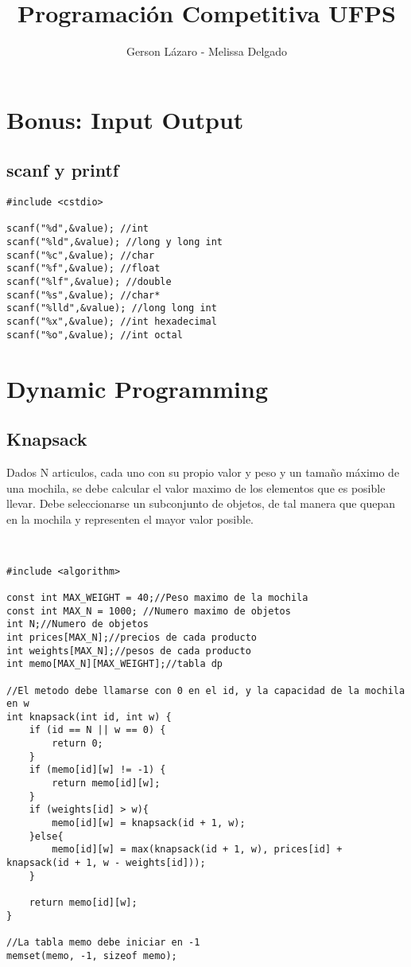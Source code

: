 \documentclass[11pt,letterpaper,twocolumn,twosided]{article}
\begin{document}
\title{Programaci\'on Competitiva UFPS}
\author{Gerson L\'azaro - Melissa Delgado}
\maketitle
\tableofcontents
{}


\section{Bonus: Input Output}

\subsection{scanf y printf}
\begin{lstlisting}
#include <cstdio>

scanf("%d",&value); //int
scanf("%ld",&value); //long y long int
scanf("%c",&value); //char 
scanf("%f",&value); //float
scanf("%lf",&value); //double
scanf("%s",&value); //char*
scanf("%lld",&value); //long long int
scanf("%x",&value); //int hexadecimal
scanf("%o",&value); //int octal
\end{lstlisting}

\section{Dynamic Programming}

\subsection{Knapsack}
Dados N articulos, cada uno con su propio valor y peso y un tama\~no m\'aximo de una mochila, se debe calcular el valor maximo de los elementos que es posible llevar.
Debe seleccionarse un subconjunto de objetos, de tal manera que quepan en la mochila y representen el mayor valor posible.
\begin{lstlisting}


#include <algorithm>

const int MAX_WEIGHT = 40;//Peso maximo de la mochila
const int MAX_N = 1000; //Numero maximo de objetos
int N;//Numero de objetos 
int prices[MAX_N];//precios de cada producto
int weights[MAX_N];//pesos de cada producto
int memo[MAX_N][MAX_WEIGHT];//tabla dp

//El metodo debe llamarse con 0 en el id, y la capacidad de la mochila en w
int knapsack(int id, int w) {
  	if (id == N || w == 0) {
  		return 0;
  	}
  	if (memo[id][w] != -1) {
  		return memo[id][w];
  	}
  	if (weights[id] > w){
  		memo[id][w] = knapsack(id + 1, w);
  	}else{
  		memo[id][w] = max(knapsack(id + 1, w), prices[id] + knapsack(id + 1, w - weights[id]));
  	}
  	
  	return memo[id][w];
}

//La tabla memo debe iniciar en -1
memset(memo, -1, sizeof memo);
\end{lstlisting}
\end{document}

